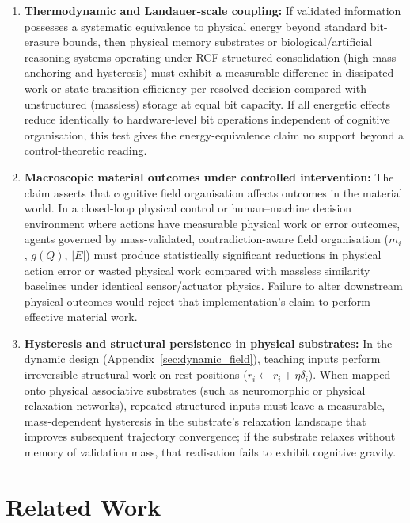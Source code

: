 \documentclass[11pt]{article}
\theoremstyle{remark}
\newcommand{\act}{E}
\begin{document}
\begin{enumerate}
  \item \textbf{Thermodynamic and Landauer-scale coupling:} If validated information possesses a systematic equivalence to physical energy beyond standard bit-erasure bounds, then physical memory substrates or biological/artificial reasoning systems operating under RCF-structured consolidation (high-mass anchoring and hysteresis) must exhibit a measurable difference in dissipated work or state-transition efficiency per resolved decision compared with unstructured (massless) storage at equal bit capacity. If all energetic effects reduce identically to hardware-level bit operations independent of cognitive organisation, this test gives the energy-equivalence claim no support beyond a control-theoretic reading.
  \item \textbf{Macroscopic material outcomes under controlled intervention:} The claim asserts that cognitive field organisation affects outcomes in the material world. In a closed-loop physical control or human--machine decision environment where actions have measurable physical work or error outcomes, agents governed by mass-validated, contradiction-aware field organisation ($m_i$, $g(Q)$, $|\act|$) must produce statistically significant reductions in physical action error or wasted physical work compared with massless similarity baselines under identical sensor/actuator physics. Failure to alter downstream physical outcomes would reject that implementation's claim to perform effective material work.
  \item \textbf{Hysteresis and structural persistence in physical substrates:} In the dynamic design (Appendix~\ref{sec:dynamic_field}), teaching inputs perform irreversible structural work on rest positions ($r_i \leftarrow r_i + \eta\delta_i$). When mapped onto physical associative substrates (such as neuromorphic or physical relaxation networks), repeated structured inputs must leave a measurable, mass-dependent hysteresis in the substrate's relaxation landscape that improves subsequent trajectory convergence; if the substrate relaxes without memory of validation mass, that realisation fails to exhibit cognitive gravity.
\end{enumerate}

\section{Related Work}
\label{sec:related}
\end{document}
